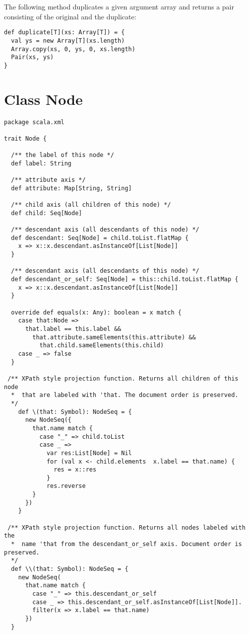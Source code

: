 {{{\example The following method duplicates a given argument array and returns a pair consisting of the original and the duplicate:
\begin{lstlisting}
def duplicate[T](xs: Array[T]) = {
  val ys = new Array[T](xs.length)
  Array.copy(xs, 0, ys, 0, xs.length)
  Pair(xs, ys)
}
\end{lstlisting}

\section{Class Node}\label{cls:Node}
\begin{lstlisting}
package scala.xml 

trait Node {

  /** the label of this node */
  def label: String               

  /** attribute axis */
  def attribute: Map[String, String] 

  /** child axis (all children of this node) */
  def child: Seq[Node]          

  /** descendant axis (all descendants of this node) */
  def descendant: Seq[Node] = child.toList.flatMap { 
    x => x::x.descendant.asInstanceOf[List[Node]] 
  } 

  /** descendant axis (all descendants of this node) */
  def descendant_or_self: Seq[Node] = this::child.toList.flatMap { 
    x => x::x.descendant.asInstanceOf[List[Node]] 
  } 

  override def equals(x: Any): boolean = x match {
    case that:Node => 
      that.label == this.label && 
        that.attribute.sameElements(this.attribute) && 
          that.child.sameElements(this.child)
    case _ => false
  } 

 /** XPath style projection function. Returns all children of this node
  *  that are labeled with 'that. The document order is preserved.
  */
    def \(that: Symbol): NodeSeq = {
      new NodeSeq({
        that.name match {
          case "_" => child.toList  
          case _ =>
            var res:List[Node] = Nil 
            for (val x <- child.elements  x.label == that.name) {
              res = x::res 
            }
            res.reverse
        }
      }) 
    }

 /** XPath style projection function. Returns all nodes labeled with the 
  *  name 'that from the descendant_or_self axis. Document order is preserved.
  */
  def \\(that: Symbol): NodeSeq = {
    new NodeSeq(
      that.name match {
        case "_" => this.descendant_or_self 
        case _ => this.descendant_or_self.asInstanceOf[List[Node]].
        filter(x => x.label == that.name) 
      })
  }


\end{lstlisting}}}}
